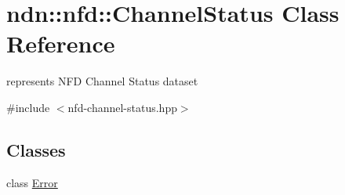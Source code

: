 \hypertarget{classndn_1_1nfd_1_1ChannelStatus}{}\section{ndn\+:\+:nfd\+:\+:Channel\+Status Class Reference}
\label{classndn_1_1nfd_1_1ChannelStatus}


represents N\+FD Channel Status dataset  




{\ttfamily \#include $<$nfd-\/channel-\/status.\+hpp$>$}

\subsection*{Classes}
\begin{DoxyCompactItemize}
\item 
class \hyperlink{classndn_1_1nfd_1_1ChannelStatus_1_1Error}{Error}
\end{DoxyCompactItemize}

